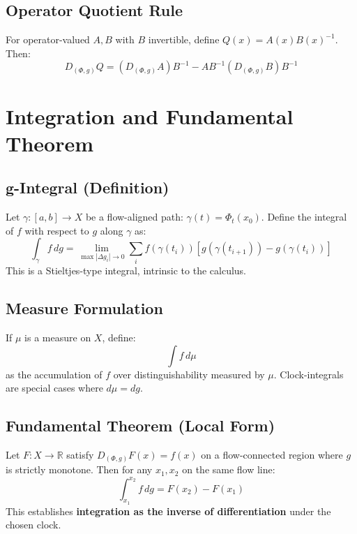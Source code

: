 \documentclass[12pt, oneside]{article}
\begin{document}
\subsection{Operator Quotient Rule}

For operator-valued $A, B$ with $B$ invertible, define $Q(x) = A(x) B(x)^{-1}$. Then:
\begin{equation}
D_{(\Phi,g)} Q = (D_{(\Phi,g)} A) B^{-1} - A B^{-1} (D_{(\Phi,g)} B) B^{-1}
\end{equation}

\section{Integration and Fundamental Theorem}

\subsection{g-Integral (Definition)}

Let $\gamma: [a,b] \rightarrow X$ be a flow-aligned path: $\gamma(t) = \Phi_t(x_0)$. Define the integral of $f$ with respect to $g$ along $\gamma$ as:
\begin{equation}
\int_\gamma f \, dg = \lim_{\max |\Delta g_i| \to 0} \sum_i f(\gamma(t_i)) [g(\gamma(t_{i+1})) - g(\gamma(t_i))]
\end{equation}
This is a Stieltjes-type integral, intrinsic to the calculus.

\subsection{Measure Formulation}

If $\mu$ is a measure on $X$, define:
\begin{equation}
\int f \, d\mu
\end{equation}
as the accumulation of $f$ over distinguishability measured by $\mu$. Clock-integrals are special cases where $d\mu = dg$.

\subsection{Fundamental Theorem (Local Form)}

Let $F: X \rightarrow \mathbb{R}$ satisfy $D_{(\Phi,g)} F(x) = f(x)$ on a flow-connected region where $g$ is strictly monotone. Then for any $x_1, x_2$ on the same flow line:
\begin{equation}
\int_{x_1}^{x_2} f \, dg = F(x_2) - F(x_1)
\end{equation}
This establishes \textbf{integration as the inverse of differentiation} under the chosen clock.
\end{document}
